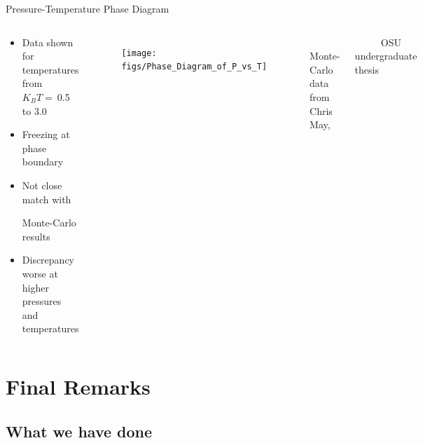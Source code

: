 \documentclass{beamer}
\begin{document}
\begin{frame}{Pressure-Temperature Phase Diagram}
\begin{columns}
	    \vspace{-3em}
        \begin{block}{}
            \begin{itemize}
            \item Data shown for temperatures from $K_BT=~$0.5 to 3.0
            \item Freezing at phase boundary
            \item Not close match with 
            
            Monte-Carlo results 
            \item Discrepancy worse at higher pressures and temperatures
            \end{itemize}
            \end{block}
         \begin{figure}       
           \centering
            \texttt{[image: figs/Phase\_Diagram\_of\_P\_vs\_T]}\\
          \end{figure}  
        \vspace{-1em}
        \footnotesize $~~~~~~~~~~~~$Monte-Carlo data from Chris May, 
    
         $~~~~~~~~~~~~$OSU undergraduate thesis
        \normalsize
     \end{columns}
\end{frame}

\section*{Final Remarks}
\subsection*{What we have done}
\end{document}
